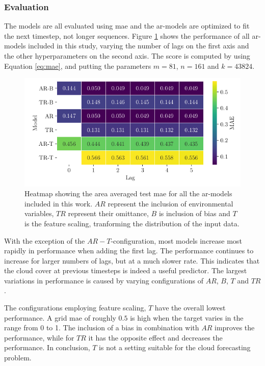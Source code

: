 \subsubsection{Evaluation}
The models are all evaluated using \acrfull{mae} and the \acrshort{ar}-models are optimized to fit the next timestep, not longer sequences. Figure \ref{fig:heatmap_ar_models} shows the performance of all \acrshort{ar}-models included in this study, varying the number of lags on the first axis and the other hyperparameters on the second axis. The score is computed by using Equation \eqref{eq:mae}, and putting the parameters $m = 81$, $n=161$ and $k=43824$. 
\begin{figure}
    \centering
    \includegraphics{python_figs/heat_ar_model_mae_test_score.png}
    \caption{Heatmap showing the area averaged test \acrshort{mae} for all the \acrshort{ar}-models included in this work. $AR$ represent the inclusion of environmental variables, $TR$ represent their omittance, $B$ is inclusion of bias and $T$ is the feature scaling, tranforming the distribution of the input data.
    }
    \label{fig:heatmap_ar_models}
\end{figure}
With the exception of the $AR-T$-configuration, most models increase most rapidly in performance when adding the first lag. The performance continues to increase for larger numbers of lags, but at a much slower rate. This indicates that the cloud cover at previous timesteps is indeed a useful predictor. The largest variations in performance is caused by varying configurations of $AR$, $B$, $T$ and $TR$. 

The configurations employing feature scaling, $T$ have the overall lowest performance. A grid \acrshort{mae} of roughly $0.5$ is high when the target varies in the range from 0 to 1. The inclusion of a bias in combination with $AR$ improves the performance, while for $TR$ it has the opposite effect and decreases the performance. In conclusion, $T$ is not a setting suitable for the cloud forecasting problem.

